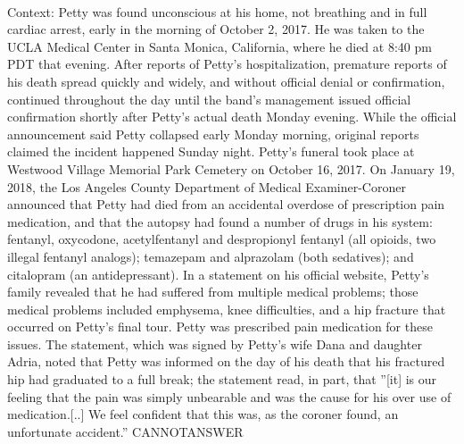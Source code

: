 \documentclass[11pt,a4paper, onecolumn]{article}
\begin{document}
\\ Context: Petty was found unconscious at his home, not breathing and in full cardiac arrest, early in the morning of October 2, 2017. He was taken to the UCLA Medical Center in Santa Monica, California, where he died at 8:40 pm PDT that evening. After reports of Petty's hospitalization, premature reports of his death spread quickly and widely, and without official denial or confirmation, continued throughout the day until the band's management issued official confirmation shortly after Petty's actual death Monday evening. While the official announcement said Petty collapsed early Monday morning, original reports claimed the incident happened Sunday night. Petty's funeral took place at Westwood Village Memorial Park Cemetery on October 16, 2017. On January 19, 2018, the Los Angeles County Department of Medical Examiner-Coroner announced that Petty had died from an accidental overdose of prescription pain medication, and that the autopsy had found a number of drugs in his system: fentanyl, oxycodone, acetylfentanyl and despropionyl fentanyl (all opioids, two illegal fentanyl analogs); temazepam and alprazolam (both sedatives); and citalopram (an antidepressant). In a statement on his official website, Petty's family revealed that he had suffered from multiple medical problems; those medical problems included emphysema, knee difficulties, and a hip fracture that occurred on Petty's final tour. Petty was prescribed pain medication for these issues. The statement, which was signed by Petty's wife Dana and daughter Adria, noted that Petty was informed on the day of his death that his fractured hip had graduated to a full break; the statement read, in part, that ''[it] is our feeling that the pain was simply unbearable and was the cause for his over use of medication.[..] We feel confident that this was, as the coroner found, an unfortunate accident.'' CANNOTANSWER
\end{document}
